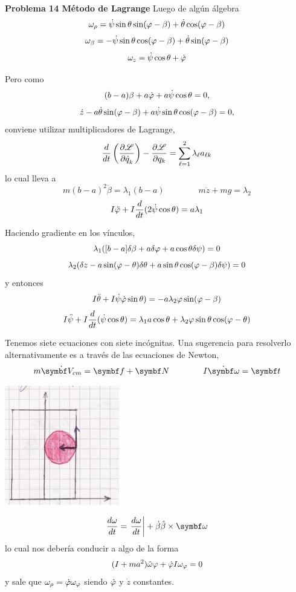 \documentclass[10pt,oneside]{CBFT_book}
\begin{document}
\begin{ejemplo}{\bf Problema 14 Método de Lagrange}
Luego de algún álgebra
\[
	\omega_\rho = \dot{\psi} \sin\theta \sin(\varphi-\beta) + \dot{\theta} \cos(\varphi-\beta)
\]
\[
	\omega_\beta = -\dot{\psi} \sin\theta \cos(\varphi-\beta) + \dot{\theta} \sin(\varphi-\beta)
\]
\[
	\omega_z = \dot{\psi} \cos\theta + \dot{\varphi}
\]

Pero como
\[
	(b-a) \beta + a \dot{\varphi} + a \dot{\psi} \cos\theta = 0 ,
\]
\[
	\dot{z} -a \dot{\theta} \sin(\varphi-\beta) + a\dot{\psi}\sin\theta\cos(\varphi -\beta) = 0,
\]
conviene utilizar multiplicadores de Lagrange,
\[
	\frac{d^{\hspace{-0.05em}} {}}{d {t}^{\hspace{-0.05em}}}\left( \frac{\partial^{\hspace{-0.05em}} {\mathscr{L}}}{\partial {\dot{q}_k}^{\hspace{-0.05em}}} \right) - \frac{\partial^{\hspace{-0.05em}} {\mathscr{L}}}{\partial {q_k}^{\hspace{-0.05em}}} = \sum_{\ell=1}^2 \lambda_\ell a_{\ell k}
\]
lo cual lleva a 
\[
	m(b-a)^2 \ddot{\beta} = \lambda_1 (b-a) \qquad \qquad 
	m \ddot{z} + m g = \lambda_2
\]
\[
	I \ddot{\varphi} + I \frac{d^{\hspace{-0.05em}} {}}{d {t}^{\hspace{-0.05em}}}( 2 \dot{\psi} \cos\theta ) = a \lambda_1
\]

Haciendo gradiente en los vínculos,
\[
	\lambda_1 ( [b-a] \delta\beta + a\delta\varphi + a\cos\theta\delta\psi) = 0
\]
\[
	\lambda_2 (\delta z - a\sin(\varphi-\theta)\delta\theta + a\sin\theta \cos(\varphi-\beta)\delta\psi) = 0
\]
y entonces
\[
	I \ddot{\theta} +  I \dot{\psi} \dot{\varphi} \sin\theta ) =
	- a \lambda_2 \varphi \sin (\varphi - \beta)
\]
\[
	I \ddot{\psi} +  I \frac{d^{\hspace{-0.05em}} {}}{d {t}^{\hspace{-0.05em}}}( \dot{\psi} \cos\theta ) =
	\lambda_1 a \cos\theta + \lambda_2 \varphi \sin \theta \cos(\varphi - \theta)
\]

Tenemos siete ecuaciones con siete incógnitas. Una sugerencia para resolverlo alternativamente
es a través de las ecuaciones de Newton,
\[
	m\dot{\vb{V}_{cm}} = \vb{f} + \vb{N} \qquad \qquad 
	I \dot{\vb{\omega}} = \vb{t}
\]

\includegraphics[scale=0.5]{images/fig_mc_lagrangebola_2.jpg}

\[
	\dtot{\omega}{t} = \left.\dtot{\omega}{t}\right| + \dot{\beta}\hat{\beta} \times \vb{\omega}
\]
lo cual nos debería conducir a algo de la forma
\[
	(I + ma^2)\ddot{\omega}\varphi + \dot{\varphi} I \omega_\varphi = 0
\]
y sale que $\omega_\rho = \dot{\varphi} \omega_\varphi$ siendo $\dot{\varphi}$ y $\dot{z}$ constantes.

\end{ejemplo}
\end{document}
